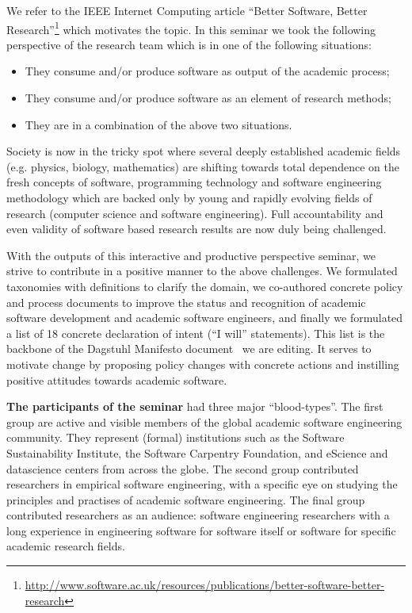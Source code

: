 \documentclass[a4paper,UKenglish]{dagrep}
\begin{document}
We refer to the IEEE Internet Computing article ``Better Software, Better Research''\footnote{\url{http://www.software.ac.uk/resources/publications/better-software-better-research}} which motivates the topic. In this seminar we took the following perspective of the research team which is in one of the following situations:
\begin{itemize}
\item They consume and/or produce software as output of the academic process;
\item They consume and/or produce software as an element of research methods;
\item They are in a combination of the above two situations.
\end{itemize}

Society is now in the tricky spot where several deeply established academic fields
(e.g. physics, biology, mathematics) are shifting towards total dependence on the fresh concepts of software, programming technology and software engineering methodology
which are backed only by young and rapidly evolving fields of research (computer science and software engineering).  Full accountability and even validity of software based research results are now duly being challenged.

With the outputs of this interactive and productive perspective seminar, we strive to contribute in a positive manner to the above challenges. We formulated taxonomies with definitions to clarify the domain, we co-authored concrete policy and process documents to improve the status and recognition of academic software development and academic software engineers, and finally we formulated a list of 18 concrete declaration of intent (``I will'' statements). This list is the backbone of the Dagstuhl Manifesto document~\cite{manifesto} we are editing. It serves to motivate change by  proposing policy changes with concrete actions and instilling positive attitudes towards academic software.


\textbf{The participants of the seminar} had three major ``blood-types''. The first group are active and visible members of the global academic software engineering community. They represent (formal) institutions such as the Software Sustainability Institute, the Software Carpentry Foundation, and eScience and datascience centers from across the globe. The second group contributed researchers in empirical software engineering, with a specific eye on studying the principles and practises of academic software engineering. The final group contributed researchers as an audience: software engineering researchers with a long experience in engineering software for software itself or software for specific academic research fields.
\end{document}
